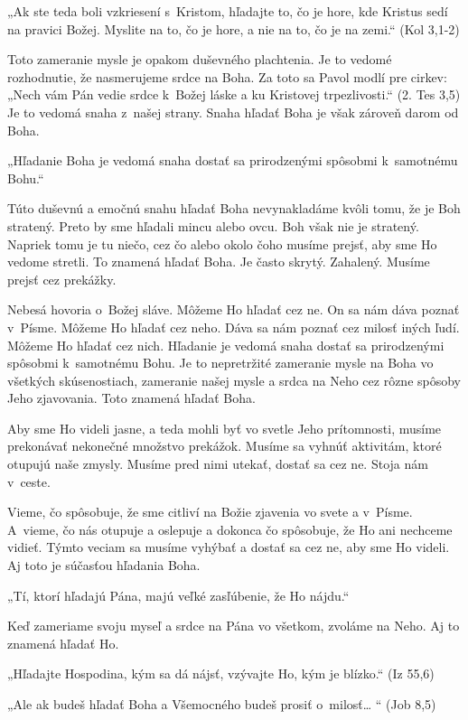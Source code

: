 „Ak ste teda boli vzkriesení s~Kristom, hľadajte to, čo je hore, kde Kristus sedí na pravici Božej. Myslite na to, čo je hore, a nie na to, čo je na zemi.“ (Kol 3,1-2)


Toto zameranie mysle je opakom duševného plachtenia. Je to vedomé rozhodnutie, že nasmerujeme srdce na Boha. Za toto sa Pavol modlí pre cirkev: „Nech vám Pán vedie srdce k~Božej láske a ku Kristovej trpezlivosti.“ (2. Tes 3,5) Je to vedomá snaha z~našej strany. Snaha hľadať Boha je však zároveň darom od Boha.

„Hľadanie Boha je vedomá snaha dostať sa prirodzenými spôsobmi k~samotnému Bohu.“

Túto duševnú a emočnú snahu hľadať Boha nevynakladáme kvôli tomu, že je Boh stratený. Preto by sme hľadali mincu alebo ovcu. Boh však nie je stratený. Napriek tomu je tu niečo, cez čo alebo okolo čoho musíme prejsť, aby sme Ho vedome stretli. To znamená hľadať Boha. Je často skrytý. Zahalený. Musíme prejsť cez prekážky.

Nebesá hovoria o~Božej sláve. Môžeme Ho hľadať cez ne. On sa nám dáva poznať v~Písme. Môžeme Ho hľadať cez neho. Dáva sa nám poznať cez milosť iných ľudí. Môžeme Ho hľadať cez nich. Hľadanie je vedomá snaha dostať sa prirodzenými spôsobmi k~samotnému Bohu. Je to nepretržité zameranie mysle na Boha vo všetkých skúsenostiach, zameranie našej mysle a srdca na Neho cez rôzne spôsoby Jeho zjavovania. Toto znamená hľadať Boha.


Aby sme Ho videli jasne, a teda mohli byť vo svetle Jeho prítomnosti, musíme prekonávať nekonečné množstvo prekážok. Musíme sa vyhnúť aktivitám, ktoré otupujú naše zmysly. Musíme pred nimi utekať, dostať sa cez ne. Stoja nám v~ceste.

Vieme, čo spôsobuje, že sme citliví na Božie zjavenia vo svete a v~Písme. A~vieme, čo nás otupuje a oslepuje a dokonca čo spôsobuje, že Ho ani nechceme vidieť. Týmto veciam sa musíme vyhýbať a dostať sa cez ne, aby sme Ho videli. Aj toto je súčasťou hľadania Boha.

„Tí, ktorí hľadajú Pána, majú veľké zasľúbenie, že Ho nájdu.“

Keď zameriame svoju myseľ a srdce na Pána vo všetkom, zvoláme na Neho. Aj to znamená hľadať Ho.

„Hľadajte Hospodina, kým sa dá nájsť, vzývajte Ho, kým je blízko.“ (Iz 55,6)

„Ale ak budeš hľadať Boha a Všemocného budeš prosiť o~milosť… “ (Job 8,5)

